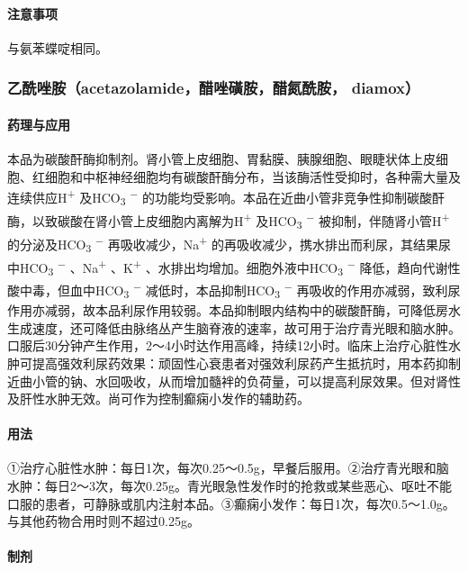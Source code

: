 \paragraph{注意事项}

与氨苯蝶啶相同。

\subsubsection{乙酰唑胺（acetazolamide，醋唑磺胺，醋氮酰胺， diamox）}

\paragraph{药理与应用}

本品为碳酸酐酶抑制剂。肾小管上皮细胞、胃黏膜、胰腺细胞、眼睫状体上皮细胞、红细胞和中枢神经细胞均有碳酸酐酶分布，当该酶活性受抑时，各种需大量及连续供应H\textsuperscript{+}
及HCO\textsubscript{3} \textsuperscript{−}
的功能均受影响。本品在近曲小管非竞争性抑制碳酸酐酶，以致碳酸在肾小管上皮细胞内离解为H\textsuperscript{+}
及HCO\textsubscript{3} \textsuperscript{−}
被抑制，伴随肾小管H\textsuperscript{+} 的分泌及HCO\textsubscript{3}
\textsuperscript{−} 再吸收减少，Na\textsuperscript{+}
的再吸收减少，携水排出而利尿，其结果尿中HCO\textsubscript{3}
\textsuperscript{−} 、Na\textsuperscript{+} 、K\textsuperscript{+}
、水排出均增加。细胞外液中HCO\textsubscript{3} \textsuperscript{−}
降低，趋向代谢性酸中毒，但血中HCO\textsubscript{3} \textsuperscript{−}
减低时，本品抑制HCO\textsubscript{3} \textsuperscript{−}
再吸收的作用亦减弱，致利尿作用亦减弱，故本品利尿作用较弱。本品抑制眼内结构中的碳酸酐酶，可降低房水生成速度，还可降低由脉络丛产生脑脊液的速率，故可用于治疗青光眼和脑水肿。口服后30分钟产生作用，2～4小时达作用高峰，持续12小时。临床上治疗心脏性水肿可提高强效利尿药效果：顽固性心衰患者对强效利尿药产生抵抗时，用本药抑制近曲小管的钠、水回吸收，从而增加髓袢的负荷量，可以提高利尿效果。但对肾性及肝性水肿无效。尚可作为控制癫痫小发作的辅助药。

\paragraph{用法}

①治疗心脏性水肿：每日1次，每次0.25～0.5g，早餐后服用。②治疗青光眼和脑水肿：每日2～3次，每次0.25g。青光眼急性发作时的抢救或某些恶心、呕吐不能口服的患者，可静脉或肌内注射本品。③癫痫小发作：每日1次，每次0.5～1.0g。与其他药物合用时则不超过0.25g。

\paragraph{制剂}

